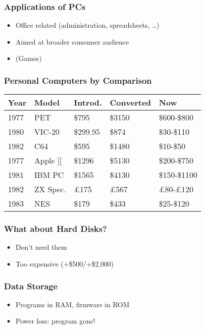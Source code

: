 \documentclass[aspectratio=43]{uva-inf-presentation}
\begin{document}
\begin{frame}
\frametitle{Applications of PCs}

\begin{itemize}
\item Office related (administration, spreadsheets, \dots)
\item Aimed at broader consumer audience
\item (Games)
\end{itemize}

\end{frame}


\begin{frame}
\frametitle{Personal Computers by Comparison}

\begin{tabular}{|l|l|l|l|l|}
\hline Year & Model & Introd. & Converted & Now \\ \hline
1977 & PET & \$795 & \$3150 & \$600-\$800 \\
1980 & VIC-20 & \$299.95 & \$874 & \$30-\$110 \\
1982 & C64 & \$595 & \$1480 & \$10-\$50 \\ \hline
1977 & Apple ][ & \$1296 & \$5130 & \$200-\$750 \\
1981 & IBM PC & \$1565 & \$4130 & \$150-\$1100 \\
1982 & ZX Spec. & \pounds 175 & \pounds 567 & \pounds 80-\pounds 120 \\ \hline
1983 & NES & \$179 & \$433 & \$25-\$120 \\ \hline
\end{tabular}

\end{frame}


\begin{frame}
\frametitle{What about Hard Disks?}

\begin{itemize}
\item Don't need them
\item Too expensive (+\$500/+\$2,000)
\end{itemize}

\end{frame}


\begin{frame}
\frametitle{Data Storage}

\begin{itemize}
\item Programs in RAM, firmware in ROM
\item Power loss: program gone!
\end{itemize}

\end{frame}
\end{document}
